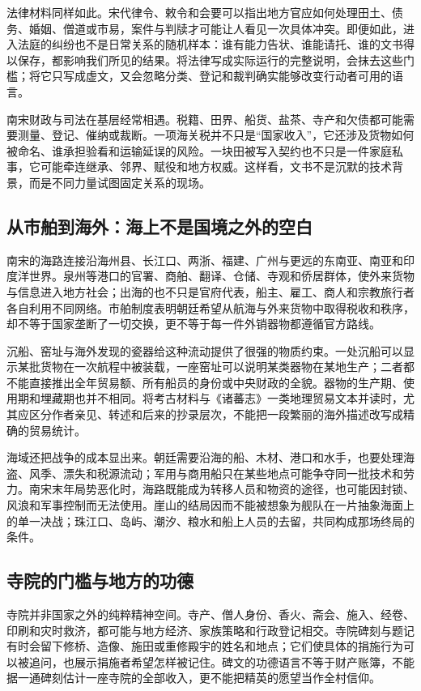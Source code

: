 法律材料同样如此。宋代律令、敕令和会要可以指出地方官应如何处理田土、债务、婚姻、僧道或市易，案件与判牍才可能让人看见一次具体冲突。即便如此，进入法庭的纠纷也不是日常关系的随机样本：谁有能力告状、谁能请托、谁的文书得以保存，都影响我们所见的结果。将法律写成实际运行的完整说明，会抹去这些门槛；将它只写成虚文，又会忽略分类、登记和裁判确实能够改变行动者可用的语言。

南宋财政与司法在基层经常相遇。税籍、田界、船货、盐茶、寺产和欠债都可能需要测量、登记、催纳或裁断。一项海关税并不只是“国家收入”，它还涉及货物如何被命名、谁承担验看和运输延误的风险。一块田被写入契约也不只是一件家庭私事，它可能牵连继承、邻界、赋役和地方权威。这样看，文书不是沉默的技术背景，而是不同力量试图固定关系的现场。

\subsection{从市舶到海外：海上不是国境之外的空白}

南宋的海路连接沿海州县、长江口、两浙、福建、广州与更远的东南亚、南亚和印度洋世界。泉州等港口的官署、商舶、翻译、仓储、寺观和侨居群体，使外来货物与信息进入地方社会；出海的也不只是官府代表，船主、雇工、商人和宗教旅行者各自利用不同网络。市舶制度表明朝廷希望从航海与外来货物中取得税收和秩序，却不等于国家垄断了一切交换，更不等于每一件外销器物都遵循官方路线。

沉船、窑址与海外发现的瓷器给这种流动提供了很强的物质约束。一处沉船可以显示某批货物在一次航程中被装载，一座窑址可以说明某类器物在某地生产；二者都不能直接推出全年贸易额、所有船员的身份或中央财政的全貌。器物的生产期、使用期和埋藏期也并不相同。将考古材料与《诸蕃志》一类地理贸易文本并读时，尤其应区分作者亲见、转述和后来的抄录层次，不能把一段繁丽的海外描述改写成精确的贸易统计。

海域还把战争的成本显出来。朝廷需要沿海的船、木材、港口和水手，也要处理海盗、风季、漂失和税源流动；军用与商用船只在某些地点可能争夺同一批技术和劳力。南宋末年局势恶化时，海路既能成为转移人员和物资的途径，也可能因封锁、风浪和军事控制而无法使用。崖山的结局因而不能被想象为舰队在一片抽象海面上的单一决战；珠江口、岛屿、潮汐、粮水和船上人员的去留，共同构成那场终局的条件。

\subsection{寺院的门槛与地方的功德}

寺院并非国家之外的纯粹精神空间。寺产、僧人身份、香火、斋会、施入、经卷、印刷和灾时救济，都可能与地方经济、家族策略和行政登记相交。寺院碑刻与题记有时会留下修桥、造像、施田或重修殿宇的姓名和地点；它们使具体的捐施行为可以被追问，也展示捐施者希望怎样被记住。碑文的功德语言不等于财产账簿，不能据一通碑刻估计一座寺院的全部收入，更不能把精英的愿望当作全村信仰。

